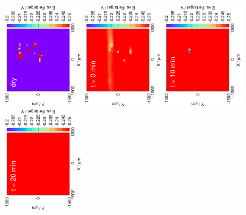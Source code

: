 \documentclass[3p]{elsarticle}
\begin{document}
\begin{figure}[H]
\centering
\includegraphics[trim = 20mm 30mm 0mm 20mm, clip, width=0.3\textwidth, angle=-90]{18011701.eps}
\includegraphics[trim = 20mm 30mm 0mm 20mm, clip, width=0.3\textwidth, angle=-90]{18011702.eps}
\includegraphics[trim = 20mm 30mm 0mm 20mm, clip, width=0.3\textwidth, angle=-90]{18011703.eps} 
\includegraphics[trim = 20mm 30mm 0mm 20mm, clip, width=0.3\textwidth, angle=-90]{18011704.eps}

\end{figure}
\end{document}
